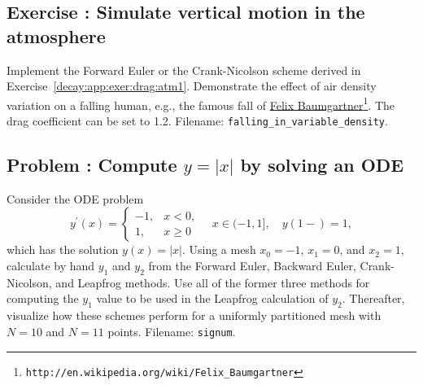 \documentclass[graybox,sectrefs,envcountresetchap,open=right,final]{svmonodo}
\newenvironment{doconceexercise}{}{}
\newcounter{doconceexercisecounter}
\begin{document}
\begin{doconceexercise}

\subsection*{Exercise \thedoconceexercisecounter: Simulate vertical motion in the atmosphere}

\label{decay:app:exer:drag:atm2}

Implement the Forward Euler or the Crank-Nicolson scheme
derived in Exercise~\ref{decay:app:exer:drag:atm1}.
Demonstrate the effect of air density variation on a falling
human, e.g., the famous fall of \href{{http://en.wikipedia.org/wiki/Felix_Baumgartner}}{Felix Baumgartner}\footnote{\texttt{http://en.wikipedia.org/wiki/Felix\_Baumgartner}}. The drag coefficient can be set to 1.2.
\noindent Filename: \Verb!falling_in_variable_density!.

\end{doconceexercise}




\begin{doconceexercise}

\subsection*{Problem \thedoconceexercisecounter: Compute $y=|x|$ by solving an ODE}

\label{decay:app:exer:signum}

Consider the ODE problem
\[
y^{\prime}(x) = \left\lbrace\begin{array}{ll}
-1, & x < 0,\\ 
1, & x \geq 0
\end{array}\right.\quad x\in (-1, 1],
\quad y(1-)=1,
\]
which has the solution $y(x)=|x|$.
Using a mesh $x_0=-1$, $x_1=0$, and $x_2=1$, calculate by hand
$y_1$ and $y_2$ from the Forward Euler, Backward Euler, Crank-Nicolson,
and Leapfrog methods. Use all of the former three methods for computing
the $y_1$ value to be used in the Leapfrog calculation of $y_2$.
Thereafter, visualize how these schemes perform for a uniformly partitioned
mesh with $N=10$ and $N=11$ points.
\noindent Filename: \texttt{signum}.

\end{doconceexercise}
\end{document}
